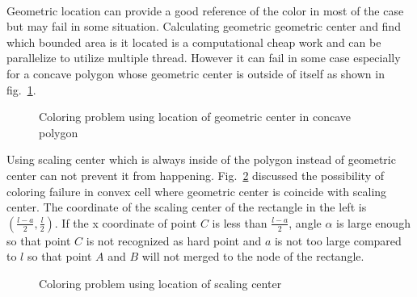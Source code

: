 \paragraph{}
Geometric location can provide a good reference of the color in most of the case but may fail in some situation.
Calculating geometric geometric center and find which bounded area is it located is a computational cheap work and can be parallelize to utilize multiple thread.
However it can fail in some case especially for a concave polygon whose geometric center is outside of itself as shown in fig.~\ref{qdt_fig:qdt_coloring_geo_problem}.
\begin{figure}[!ht]
    \centering
    \caption[Coloring problem using location of geometric center in concave polygon]{Coloring problem using location of geometric center in concave polygon}
    \label{qdt_fig:qdt_coloring_geo_problem}
\end{figure}

Using scaling center which is always inside of the polygon instead of geometric center can not prevent it from happening.
Fig.~\ref{qdt_fig:qdt_coloring_geo_problem_sc} discussed the possibility of coloring failure in convex cell where geometric center is coincide with scaling center.
The coordinate of the scaling center of the rectangle in the left is $(\frac{l-a}{2},\frac{l}{2})$.
If the x coordinate of point $C$ is less than $\frac{l-a}{2}$, angle $\alpha$ is large enough so that point $C$ is not recognized as hard point and $a$ is not too large compared to $l$ so that point $A$ and $B$ will not merged to the node of the rectangle.

    \begin{figure}[!ht]
        \centering
        \caption[Coloring problem using location of scaling center]{Coloring problem using location of scaling center}
        \label{qdt_fig:qdt_coloring_geo_problem_sc}
    \end{figure}

